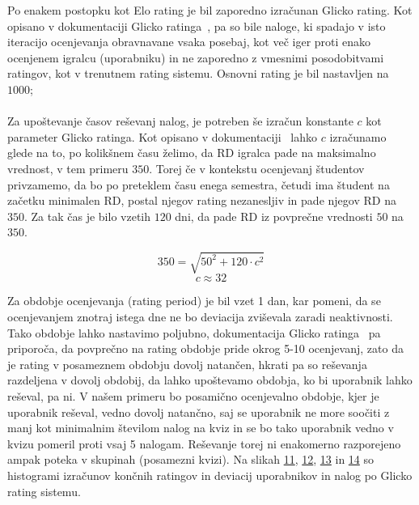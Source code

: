 \documentclass{IEEEtran}
\begin{document}
Po enakem postopku kot Elo rating je bil zaporedno izračunan Glicko rating. Kot opisano v dokumentaciji Glicko ratinga~\cite{glickoDoc}, pa so bile naloge,
ki spadajo v isto iteracijo ocenjevanja obravnavane vsaka posebaj, kot več iger proti enako ocenjenem igralcu (uporabniku) in ne zaporedno z vmesnimi posodobitvami ratingov, kot v trenutnem rating sistemu. Osnovni rating je bil nastavljen na $1000$;
\hfill
\\
\\
Za upoštevanje časov reševanj nalog, je potreben še izračun konstante $c$ kot parameter Glicko ratinga. Kot opisano v dokumentaciji~\cite{glickoDoc} lahko $c$
izračunamo glede na to, po kolikšnem času želimo, da $\mathrm{RD}$ igralca pade na maksimalno vrednost, v tem primeru $350$. Torej če v kontekstu ocenjevanj študentov privzamemo, da bo po preteklem času enega semestra, četudi ima študent na začetku minimalen $\mathrm{RD}$, postal njegov rating nezanesljiv in pade njegov $\mathrm{RD}$ na $350$. Za tak čas je bilo vzetih $120$ dni, da pade $\mathrm{RD}$ iz povprečne vrednosti $50$ na $350$. 

\begin{equation}
    350=\sqrt{50^{2}+120\cdot c^{2}}
\end{equation}
\begin{equation}
    c\approx 32
\end{equation}


Za obdobje ocenjevanja (rating period) je bil
vzet 1 dan, kar pomeni, da se ocenjevanjem znotraj istega dne ne bo deviacija zviševala zaradi neaktivnosti. Tako obdobje lahko nastavimo poljubno,
dokumentacija Glicko ratinga~\cite{glickoDoc} pa priporoča, da povprečno na rating obdobje pride okrog 5-10 ocenjevanj, zato da je rating v posameznem obdobju dovolj natančen, hkrati pa so reševanja razdeljena v dovolj obdobij, da lahko upoštevamo obdobja, ko bi uporabnik lahko reševal, pa ni. V našem primeru bo
posamično ocenjevalno obdobje, kjer je uporabnik reševal, vedno dovolj natančno, saj se uporabnik ne more soočiti z manj kot minimalnim številom nalog na kviz in se bo tako uporabnik vedno v kvizu pomeril proti vsaj 5 nalogam. Reševanje torej ni enakomerno razporejeno ampak poteka v skupinah (posamezni
kvizi).
\newpage
Na slikah \hyperref[fig:glickoU]{11}, \hyperref[fig:glickoE]{12}, \hyperref[fig:userRD]{13} in \hyperref[fig:exerciseRD]{14} so histogrami izračunov končnih 
ratingov in deviacij uporabnikov in nalog po Glicko rating sistemu.
\end{document}
